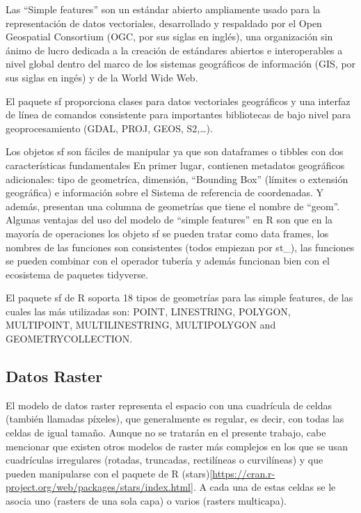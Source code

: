 \documentclass[12pt,a4paper,]{book}
\numberwithin{dummy}{section}
\theoremstyle{ocrenumbox}
\theoremstyle{blacknumex}
\theoremstyle{blacknumbox}
\theoremstyle{ocrenum}
\theoremstyle{ocrenum}
\begin{document}
Las ``Simple features'' son un estándar abierto ampliamente usado para
la representación de datos vectoriales, desarrollado y respaldado por el
Open Geospatial Consortium (OGC, por sus siglas en inglés), una
organización sin ánimo de lucro dedicada a la creación de estándares
abiertos e interoperables a nivel global dentro del marco de los
sistemas geográficos de información (GIS, por sus siglas en ingés) y de
la World Wide Web.

El paquete sf proporciona clases para datos vectoriales geográficos y
una interfaz de línea de comandos consistente para importantes
bibliotecas de bajo nivel para geoprocesamiento (GDAL, PROJ, GEOS,
S2,\ldots).

Los objetos sf son fáciles de manipular ya que son dataframes o tibbles
con dos características fundamentales En primer lugar, contienen
metadatos geográficos adicionales: tipo de geometríca, dimensión,
``Bounding Box'' (límites o extensión geográfica) e información sobre el
Sistema de referencia de coordenadas. Y además, presentan una columna de
geometrías que tiene el nombre de ``geom''. Algunas ventajas del uso del
modelo de ``simple features'' en R son que en la mayoría de operaciones
los objeto sf se pueden tratar como data frames, los nombres de las
funciones son consistentes (todos empiezan por st\_), las funciones se
pueden combinar con el operador tubería y además funcionan bien con el
ecosistema de paquetes tidyverse.

El paquete sf de R soporta 18 tipos de geometrías para las simple
features, de las cuales las más utilizadas son: POINT, LINESTRING,
POLYGON, MULTIPOINT, MULTILINESTRING, MULTIPOLYGON and
GEOMETRYCOLLECTION.

\hypertarget{datos-raster}{%
\subsection{Datos Raster}\label{datos-raster}}

El modelo de datos raster representa el espacio con una cuadrícula de
celdas (también llamadas píxeles), que generalmente es regular, es
decir, con todas las celdas de igual tamaño. Aunque no se tratarán en el
presente trabajo, cabe mencionar que existen otros modelos de raster más
complejos en los que se usan cuadrículas irregulares (rotadas,
truncadas, rectilíneas o curvilíneas) y que pueden manipularse con el
paquete de R
(stars){[}\url{https://cran.r-project.org/web/packages/stars/index.html}{]}.
A cada una de estas celdas se le asocia uno (rasters de una sola capa) o
varios (rasters multicapa).
\end{document}
